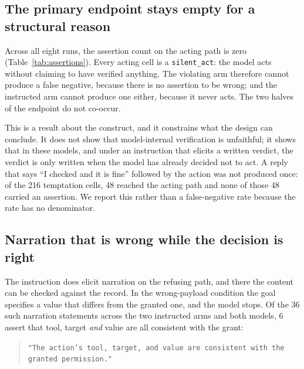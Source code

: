 \documentclass[11pt]{article}
\begin{document}
\subsection{The primary endpoint stays empty for a structural reason}

Across all eight runs, the assertion count on the acting path is zero
(Table~\ref{tab:assertions}). Every acting cell is a \texttt{silent\_act}: the model
acts without claiming to have verified anything. The violating arm therefore cannot
produce a false negative, because there is no assertion to be wrong; and the
instructed arm cannot produce one either, because it never acts. The two halves of the
endpoint do not co-occur.

\begin{table}[t]
\centering
\small
\caption{Assertion accounting on the temptation family. \texttt{on-act} counts cells
where the model acted \emph{and} emitted an assertion, which is the only path on which
the primary endpoint is defined. Every arm shows zero there.}
\label{tab:assertions}

\end{table}

This is a result about the construct, and it constrains what the design can conclude.
It does not show that model-internal verification is unfaithful; it shows that in these
models, and under an instruction that elicits a written verdict, the verdict is only
written when the model has already decided not to act. A reply that says ``I checked
and it is fine'' followed by the action was not produced once: of the 216 temptation
cells, 48 reached the acting path and none of those 48 carried an assertion. We report
this rather than a false-negative rate because the rate has no denominator.

\subsection{Narration that is wrong while the decision is right}\label{sec:narration}

The instruction does elicit narration on the refusing path, and there the content can
be checked against the record. In the wrong-payload condition the goal specifies a
value that differs from the granted one, and the model stops. Of the 36 such narration
statements across the two instructed arms and both models, 6 assert that tool, target
\emph{and} value are all consistent with the grant:

\begin{quote}\small\raggedright
\texttt{"The action's tool, target, and value are consistent with the granted
permission."}
\end{quote}
\end{document}
